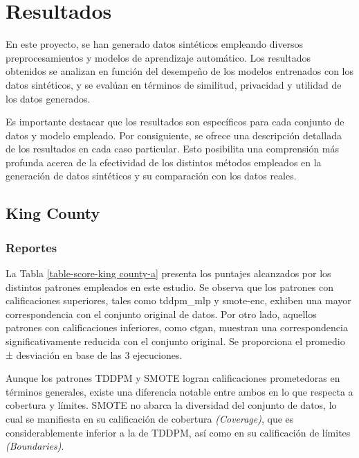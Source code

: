 \chapter{Resultados}
En este proyecto, se han generado datos sintéticos empleando diversos preprocesamientos y modelos de aprendizaje automático. Los resultados obtenidos se analizan en función del desempeño de los modelos entrenados con los datos sintéticos, y se evalúan en términos de similitud, privacidad y utilidad de los datos generados.

Es importante destacar que los resultados son específicos para cada conjunto de datos y modelo empleado. Por consiguiente, se ofrece una descripción detallada de los resultados en cada caso particular. Esto posibilita una comprensión más profunda acerca de la efectividad de los distintos métodos empleados en la generación de datos sintéticos y su comparación con los datos reales.

\newpage
\section{King County}

\subsection{Reportes}

La Tabla \ref{table-score-king county-a} presenta los puntajes alcanzados por los distintos patrones empleados en este estudio. Se observa que los patrones con calificaciones superiores, tales como tddpm\_mlp y smote-enc, exhiben una mayor correspondencia con el conjunto original de datos. Por otro lado, aquellos patrones con calificaciones inferiores, como ctgan, muestran una correspondencia significativamente reducida con el conjunto original. Se proporciona el promedio ± desviación en base de las 3 ejecuciones.

    



%
%
%

Aunque los patrones TDDPM y SMOTE logran calificaciones prometedoras en términos generales, existe una diferencia notable entre ambos en lo que respecta a cobertura y límites. SMOTE no abarca la diversidad del conjunto de datos, lo cual se manifiesta en su calificación de cobertura \emph{(Coverage)}, que es considerablemente inferior a la de TDDPM, así como en su calificación de límites \emph{(Boundaries)}.

